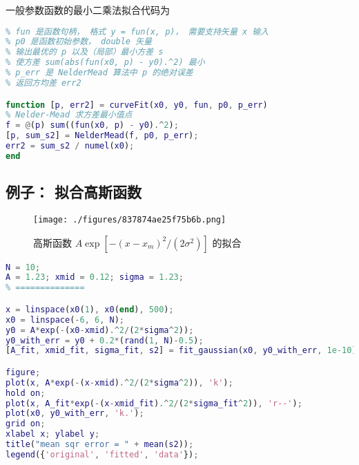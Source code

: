 一般参数函数的最小二乘法拟合代码为
\begin{lstlisting}[language=matlab, caption=curveFit.m]
% 最小二乘法拟合一元实函数，(x0,y0) 是数据点
% fun 是函数句柄， 格式 y = fun(x, p)， 需要支持矢量 x 输入
% p0 是函数初始参数， double 矢量
% 输出最优的 p 以及（局部）最小方差 s
% 使方差 sum(abs(fun(x0, p) - y0).^2) 最小
% p_err 是 NelderMead 算法中 p 的绝对误差
% 返回方均差 err2

function [p, err2] = curveFit(x0, y0, fun, p0, p_err)
% Nelder-Mead 求方差最小值点
f = @(p) sum((fun(x0, p) - y0).^2);
[p, sum_s2] = NelderMead(f, p0, p_err);
err2 = sum_s2 / numel(x0);
end
\end{lstlisting}

\subsection{例子： 拟合高斯函数}
\begin{figure}[ht]
\centering
\texttt{[image: ./figures/837874ae25f75b6b.png]}
\caption{高斯函数 $A\exp[-(x-x_m)^2/(2\sigma^2)]$ 的拟合} \label{fig_CurFit_2}
\end{figure}

\begin{lstlisting}[language=matlab,caption=fit\_gaussian\_test.m]
% === params ===
N = 10;
A = 1.23; xmid = 0.12; sigma = 1.23;
% ==============

x = linspace(x0(1), x0(end), 500);
x0 = linspace(-6, 6, N);
y0 = A*exp(-(x0-xmid).^2/(2*sigma^2));
y0_with_err = y0 + 0.2*(rand(1, N)-0.5);
[A_fit, xmid_fit, sigma_fit, s2] = fit_gaussian(x0, y0_with_err, 1e-10);

figure;
plot(x, A*exp(-(x-xmid).^2/(2*sigma^2)), 'k');
hold on;
plot(x, A_fit*exp(-(x-xmid_fit).^2/(2*sigma_fit^2)), 'r--');
plot(x0, y0_with_err, 'k.');
grid on;
xlabel x; ylabel y;
title("mean sqr error = " + mean(s2));
legend({'original', 'fitted', 'data'});
\end{lstlisting}
